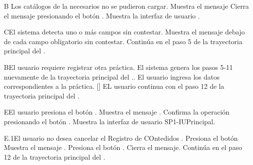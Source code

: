 \begin{UCtrayectoriaA}{B}{ Los catálogos de la  necesarios no se pudieron cargar.}
	\UCpaso Muestra el mensaje 
	\UCpaso[\UCactor] Cierra el mensaje presionando el botón .
	\UCpaso Muestra la interfaz de usuario .
\end{UCtrayectoriaA}

\begin{UCtrayectoriaA}{C}{El sistema detecta uno o más campos sin contestar.}
	\UCpaso Muestra el mensaje  debajo de cada campo obligatorio sin contestar.
	\UCpaso Continúa en el paso 5 de la trayectoria principal del .
\end{UCtrayectoriaA}


\begin{UCtrayectoriaA}{B}{El usuario requiere registrar otra práctica.}
    \UCpaso El sistema genera los pasos 5-11 nuevamente de la trayectoria principal del ..
    \UCpaso[\UCactor] El usuario ingresa los datos correspondientes a la práctica.
    \UCpaso{}[\UCactor] EL usuario continua con el paso 12 de la trayectoria principal del .
\end{UCtrayectoriaA}

\begin{UCtrayectoriaA}{E}{El usuario presiona el botón .}
	\UCpaso Muestra el mensaje .
	\UCpaso[\UCactor] Confirma la operación presionando el botón .
	\UCpaso Muestra la interfaz de usuario {SP1-IU}{Principal}.
\end{UCtrayectoriaA}

\begin{UCtrayectoriaA}{E.1}{El usuario no desea cancelar el Registro de COntedidos .}
	\UCpaso[\UCactor] Presiona el botón 
	\UCpaso Muestra el mensaje .
	\UCpaso[\UCactor] Presiona el botón .
	\UCpaso Cierra el mensaje.
	\UCpaso Continúa en el paso 12 de la trayectoria principal del .
\end{UCtrayectoriaA}


